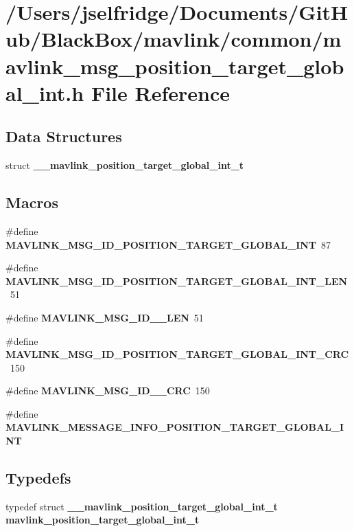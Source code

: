 \section{/\+Users/jselfridge/\+Documents/\+Git\+Hub/\+Black\+Box/mavlink/common/mavlink\+\_\+msg\+\_\+position\+\_\+target\+\_\+global\+\_\+int.h File Reference}
\label{mavlink__msg__position__target__global__int_8h}
\subsection*{Data Structures}
\begin{DoxyCompactItemize}
\item 
struct \textbf{ \+\_\+\+\_\+mavlink\+\_\+position\+\_\+target\+\_\+global\+\_\+int\+\_\+t}
\end{DoxyCompactItemize}
\subsection*{Macros}
\begin{DoxyCompactItemize}
\item 
\#define \textbf{ M\+A\+V\+L\+I\+N\+K\+\_\+\+M\+S\+G\+\_\+\+I\+D\+\_\+\+P\+O\+S\+I\+T\+I\+O\+N\+\_\+\+T\+A\+R\+G\+E\+T\+\_\+\+G\+L\+O\+B\+A\+L\+\_\+\+I\+NT}~87
\item 
\#define \textbf{ M\+A\+V\+L\+I\+N\+K\+\_\+\+M\+S\+G\+\_\+\+I\+D\+\_\+\+P\+O\+S\+I\+T\+I\+O\+N\+\_\+\+T\+A\+R\+G\+E\+T\+\_\+\+G\+L\+O\+B\+A\+L\+\_\+\+I\+N\+T\+\_\+\+L\+EN}~51
\item 
\#define \textbf{ M\+A\+V\+L\+I\+N\+K\+\_\+\+M\+S\+G\+\_\+\+I\+D\+\_\+\_\+\+L\+EN}~51
\item 
\#define \textbf{ M\+A\+V\+L\+I\+N\+K\+\_\+\+M\+S\+G\+\_\+\+I\+D\+\_\+\+P\+O\+S\+I\+T\+I\+O\+N\+\_\+\+T\+A\+R\+G\+E\+T\+\_\+\+G\+L\+O\+B\+A\+L\+\_\+\+I\+N\+T\+\_\+\+C\+RC}~150
\item 
\#define \textbf{ M\+A\+V\+L\+I\+N\+K\+\_\+\+M\+S\+G\+\_\+\+I\+D\+\_\+\_\+\+C\+RC}~150
\item 
\#define \textbf{ M\+A\+V\+L\+I\+N\+K\+\_\+\+M\+E\+S\+S\+A\+G\+E\+\_\+\+I\+N\+F\+O\+\_\+\+P\+O\+S\+I\+T\+I\+O\+N\+\_\+\+T\+A\+R\+G\+E\+T\+\_\+\+G\+L\+O\+B\+A\+L\+\_\+\+I\+NT}
\end{DoxyCompactItemize}
\subsection*{Typedefs}
\begin{DoxyCompactItemize}
\item 
typedef struct \textbf{ \+\_\+\+\_\+mavlink\+\_\+position\+\_\+target\+\_\+global\+\_\+int\+\_\+t} \textbf{ mavlink\+\_\+position\+\_\+target\+\_\+global\+\_\+int\+\_\+t}
\end{DoxyCompactItemize}


